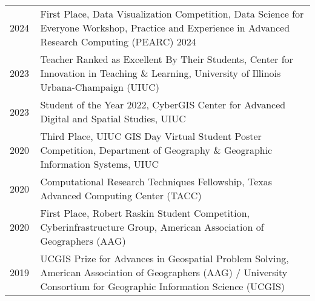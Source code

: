 \documentclass{acmcv}
\begin{document}
    \begin{longtable}{p{0.1\linewidth} p{0.9\linewidth}}

        2024 & First Place, Data Visualization Competition, Data Science for Everyone Workshop, Practice and Experience in Advanced Research Computing (PEARC) 2024 \\

        2023 & Teacher Ranked as Excellent By Their Students,
        Center for Innovation in Teaching \& Learning, University of Illinois Urbana-Champaign (UIUC)\\

        2023 & Student of the Year 2022, CyberGIS Center for Advanced Digital and Spatial Studies, UIUC\\

        2020 & Third Place, UIUC GIS Day Virtual Student Poster Competition, Department of Geography \& Geographic Information Systems, UIUC \\

        2020 & Computational Research Techniques Fellowship, Texas Advanced Computing Center (TACC)\\

        2020 & First Place, Robert Raskin Student Competition, Cyberinfrastructure Group, American Association of Geographers (AAG) \\

        2019 & UCGIS Prize for Advances in Geospatial Problem Solving, American Association of Geographers (AAG) / University Consortium for Geographic Information Science (UCGIS)  \\





    \end{longtable}
\end{document}
